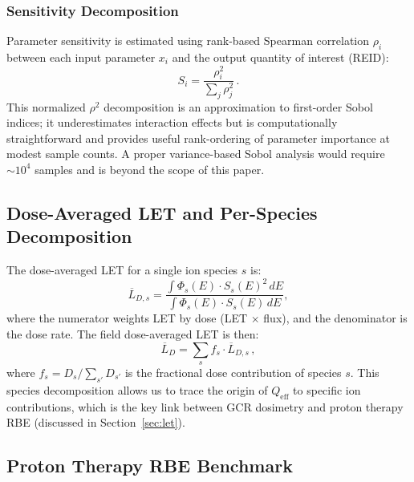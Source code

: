 \subsubsection{Sensitivity Decomposition}
\label{sec:sobol}

Parameter sensitivity is estimated using rank-based Spearman correlation
$\rho_i$ between each input parameter $x_i$ and the output quantity of interest
(REID):
\begin{equation}
  S_i = \frac{\rho_i^2}{\sum_j \rho_j^2}\,.
  \label{eq:sensitivity}
\end{equation}
This normalized $\rho^2$ decomposition is an approximation to first-order
Sobol indices; it underestimates interaction effects but is computationally
straightforward and provides useful rank-ordering of parameter importance
at modest sample counts.
A proper variance-based Sobol analysis would require $\sim 10^4$ samples
\citep{saltelli2010} and is beyond the scope of this paper.

\subsection{Dose-Averaged LET and Per-Species Decomposition}
\label{sec:letmethod}

The dose-averaged LET for a single ion species $s$ is:
\begin{equation}
  \overline{L}_{D,s} = \frac{\int \Phi_s(E) \cdot S_s(E)^2 \, dE}
                            {\int \Phi_s(E) \cdot S_s(E) \, dE},
  \label{eq:letd_species}
\end{equation}
where the numerator weights LET by dose (LET $\times$ flux), and the
denominator is the dose rate.
The field dose-averaged LET is then:
\begin{equation}
  \overline{L}_D = \sum_s f_s \cdot \overline{L}_{D,s}\,,
  \label{eq:letd_field}
\end{equation}
where $f_s = D_s / \sum_{s'} D_{s'}$ is the fractional dose contribution
of species $s$.
This species decomposition allows us to trace the origin of $Q_\mathrm{eff}$
to specific ion contributions, which is the key link between GCR dosimetry
and proton therapy RBE (discussed in Section~\ref{sec:let}).

\subsection{Proton Therapy RBE Benchmark}
\label{sec:rbemethods}


